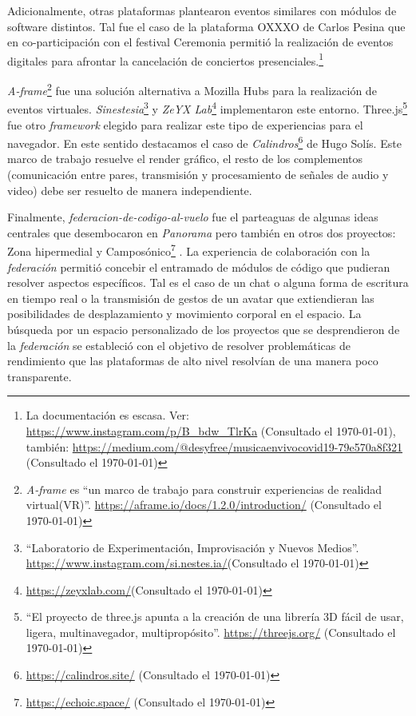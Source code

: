 Adicionalmente, otras plataformas plantearon eventos similares con módulos de software distintos. Tal fue el caso de la plataforma OXXXO de Carlos Pesina que en co-participación con el festival Ceremonia permitió la realización de eventos digitales para afrontar la cancelación de conciertos presenciales.\footnote{La documentación es escasa. Ver: \url{https://www.instagram.com/p/B_bdw_TlrKa} (Consultado el \today), también: \url{https://medium.com/@desyfree/musicaenvivocovid19-79e570a8f321} (Consultado el \today)}

\textit{A-frame}\footnote{\textit{A-frame} es ``un marco de trabajo para construir experiencias de realidad virtual(VR)''. \url{https://aframe.io/docs/1.2.0/introduction/} (Consultado el \today)} fue una solución alternativa a Mozilla Hubs para la realización de eventos virtuales. \textit{Sinestesia}\footnote{``Laboratorio de Experimentación, Improvisación y Nuevos Medios''. \url{https://www.instagram.com/si.nestes.ia/}(Consultado el \today)} y \textit{ZeYX Lab}\footnote{\url{https://zeyxlab.com/}(Consultado el \today)} implementaron este entorno. Three.js\footnote{``El proyecto de three.js apunta a la creación de una librería 3D fácil de usar, ligera, multinavegador, multipropósito''. \url{https://threejs.org/} (Consultado el \today)} fue otro \textit{framework} elegido para realizar este tipo de experiencias para el navegador. En este sentido destacamos el caso de \textit{Calindros}\footnote{\url{https://calindros.site/} (Consultado el \today)} de Hugo Solís. Este marco de trabajo resuelve el render gráfico, el resto de los complementos (comunicación entre pares, transmisión y procesamiento de señales de audio y video) debe ser resuelto de manera independiente. %

Finalmente, \textit{federacion-de-codigo-al-vuelo} \citep{en-vivo} fue el parteaguas de algunas ideas centrales que desembocaron en \textit{Panorama} pero también en otros dos proyectos: Zona hipermedial y Camposónico\footnote{\url{https://echoic.space/} (Consultado el \today)} \citep{camposonico}. La experiencia de colaboración con la \textit{federación} permitió concebir el entramado de módulos de código que pudieran resolver aspectos específicos. Tal es el caso de un chat o alguna forma de escritura en tiempo real o la transmisión de gestos de un avatar que extiendieran las posibilidades de desplazamiento y movimiento corporal en el espacio. La búsqueda por un espacio personalizado de los proyectos que se desprendieron de la \textit{federación} se estableció con el objetivo de resolver problemáticas de rendimiento que las plataformas de alto nivel resolvían de una manera poco transparente. 

